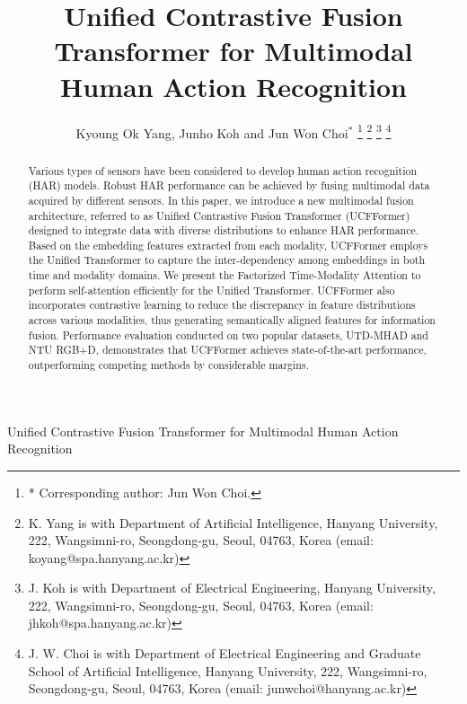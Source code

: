 \documentclass[letterpaper,journal]{IEEEtran}
\begin{document}
\title{Unified Contrastive Fusion Transformer for Multimodal Human Action Recognition }
\author{Kyoung Ok Yang, Junho Koh and Jun Won Choi$^*$
\thanks{* Corresponding author: Jun Won Choi.}%
\thanks{K. Yang is with Department of Artificial Intelligence, Hanyang University, 222, Wangsimni-ro, Seongdong-gu, Seoul, 04763, Korea (email: koyang@spa.hanyang.ac.kr)}%
\thanks{J. Koh is with Department of Electrical Engineering, Hanyang University, 222, Wangsimni-ro, Seongdong-gu, Seoul, 04763, Korea (email: jhkoh@spa.hanyang.ac.kr)}%
\thanks{J. W. Choi is with Department of Electrical Engineering and Graduate School of Artificial Intelligence, Hanyang University, 222, Wangsimni-ro, Seongdong-gu, Seoul, 04763, Korea (email: junwchoi@hanyang.ac.kr)}
}

\markboth{}%
{Unified Contrastive Fusion Transformer for Multimodal Human Action Recognition}


\maketitle

\begin{abstract}
Various types of sensors have been considered to develop human action recognition (HAR) models. Robust HAR performance can be achieved by fusing multimodal data acquired by different sensors. In this paper, we introduce a new multimodal fusion architecture, referred to as Unified Contrastive Fusion Transformer (UCFFormer) designed to integrate data with diverse distributions to enhance HAR performance. Based on the embedding features extracted from each modality, UCFFormer employs the Unified Transformer to capture the inter-dependency among embeddings in both time and modality domains. We present the Factorized Time-Modality Attention to perform self-attention efficiently for the Unified Transformer. UCFFormer also incorporates contrastive learning to reduce the discrepancy in feature distributions across various modalities, thus generating semantically aligned features for information fusion. Performance evaluation conducted on two popular datasets, UTD-MHAD and NTU RGB+D, demonstrates that UCFFormer achieves state-of-the-art performance, outperforming competing methods by considerable margins. 
\end{abstract}
\end{document}
